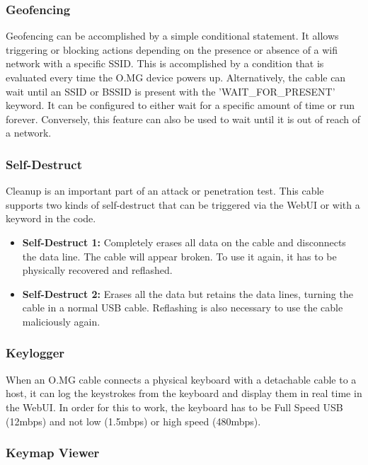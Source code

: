\subsubsection{Geofencing}

Geofencing can be accomplished by a simple conditional statement. It allows triggering or blocking actions depending on the presence or absence of a wifi network with a specific SSID. This is accomplished by a condition that is evaluated every time the O.MG device powers up. Alternatively, the cable can wait until an SSID or BSSID is present with the 'WAIT\_FOR\_PRESENT' keyword.
It can be configured to either wait for a specific amount of time or run forever. Conversely, this feature can also be used to wait until it is out of reach of a network.

\subsubsection{Self-Destruct}

Cleanup is an important part of an attack or penetration test. This cable supports two kinds of self-destruct that can be triggered via the WebUI or with a keyword in the code.
\begin{itemize}
    \item  \textbf{Self-Destruct 1:} Completely erases all data on the cable and disconnects the data line. The cable will appear broken. To use it again, it has to be physically recovered and reflashed.  
    \item  \textbf{Self-Destruct 2:}  Erases all the data but retains the data lines, turning the cable in a normal USB cable. Reflashing is also necessary to use the cable maliciously again. 
\end{itemize}


\subsubsection{Keylogger}

When an O.MG cable connects a physical keyboard with a detachable cable to a host, it can log the keystrokes from the keyboard and display them in real time in the WebUI. In order for this to work, the keyboard has to be Full Speed USB (12mbps) and not low (1.5mbps) or high speed (480mbps). 

\subsubsection{Keymap Viewer}

